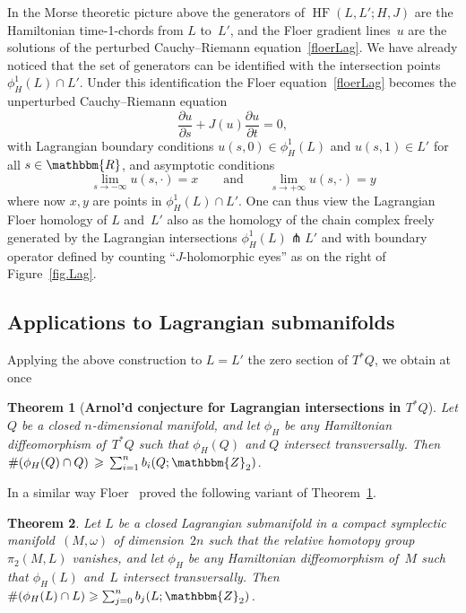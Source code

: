 \documentclass[12pt,twoside]{amsart}
\theoremstyle{plain}
\newtheorem{theorem}{Theorem}[section]
\numberwithin{figure}{section}
\numberwithin{equation}{section}
\def\HF{\operatorname{HF}}
\def\go{\omega}
\def\RR{\mathbbm{R}}
\def\ZZ{\mathbbm{Z}}
\begin{document}
In the Morse theoretic picture above the generators of $\HF (L,L';H,J)$ are the Hamiltonian 
time-1-chords from $L$ to~$L'$, and the Floer gradient lines~$u$ are the solutions of the perturbed 
Cauchy--Riemann equation~\eqref{floerLag}.
We have already noticed that the set of generators can be identified with the intersection points 
$\phi_H^1(L) \cap L'$. Under this identification the Floer equation~\eqref{floerLag} becomes 
the unperturbed Cauchy--Riemann equation 
\begin{equation*} 
\frac{\partial u}{\partial s} + J(u) \frac{\partial u}{\partial t} = 0,
\end{equation*}
with Lagrangian boundary conditions $u(s,0) \in \phi_H^1(L)$ and $u(s,1) \in L'$ for all $s \in \RR$, and
asymptotic conditions 
\[
\lim_{s\rightarrow -\infty} u(s,\cdot) = x \qquad \mbox{and} \qquad 
\lim_{s\rightarrow +\infty} u(s,\cdot) = y
\]
where now $x,y$ are points in $\phi_H^1(L) \cap L'$.
One can thus view the Lagrangian Floer homology of $L$ and~$L'$ also as the homology 
of the chain complex freely generated by the Lagrangian intersections $\phi_H^1(L) \pitchfork L'$ 
and with boundary operator defined by counting ``$J$-holomorphic eyes'' 
as on the right of Figure~\ref{fig.Lag}.



\subsection{Applications to Lagrangian submanifolds}

Applying the above construction to $L=L'$ the zero section of $T^*Q$, we obtain at once 

\begin{theorem} 
[\bf Arnol'd conjecture for Lagrangian intersections in $T^*Q$] \label{t:lag}
Let $Q$ be a closed $n$-dimensional manifold, and let $\phi_H$ be any Hamiltonian diffeomorphism of~$T^*Q$ such that $\phi_H(Q)$ and $Q$ intersect transversally. 
Then $\# (\phi_H(Q) \cap Q) \,\geqslant\, \sum_{i=1}^n b_i(Q;\ZZ_2)$.
\end{theorem}

In a similar way Floer~\cite{Flo88:Lag} proved the following variant of Theorem~\ref{t:lag}.

\begin{theorem} \label{t:lagclosed}
Let $L$ be a closed Lagrangian submanifold in a compact symplectic manifold~$(M,\go)$
of dimension~$2n$ 
such that the relative homotopy group $\pi_2 (M,L)$ vanishes,
and let $\phi_H$ be any Hamiltonian diffeomorphism of~$M$ such that $\phi_H(L)$ and~$L$ 
intersect transversally. 
Then~$\# (\phi_H(L) \cap L) \geqslant \sum_{j=0}^n b_j(L;\ZZ_2)$.
\end{theorem}
\end{document}
